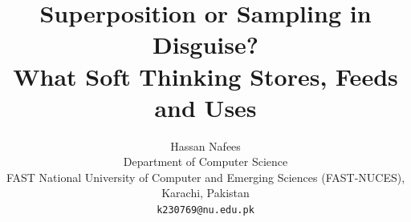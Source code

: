 \documentclass[10pt,letterpaper]{article}
\title{Superposition or Sampling in Disguise?\\What Soft Thinking Stores, Feeds and Uses}
\author{Hassan Nafees\\[2pt]
  \small Department of Computer Science\\
  \small FAST National University of Computer and Emerging Sciences (FAST-NUCES), Karachi, Pakistan\\
  \small\texttt{k230769@nu.edu.pk}}
\date{}
\begin{document}
\maketitle
\thispagestyle{plain}
\linenumbers













\clearpage
\appendix
\setcounter{figure}{0}\setcounter{table}{0}
\renewcommand{\thefigure}{A\arabic{figure}}\renewcommand{\theHfigure}{A\arabic{figure}}
\renewcommand{\thetable}{A\arabic{table}}\renewcommand{\theHtable}{A\arabic{table}}





\end{document}
